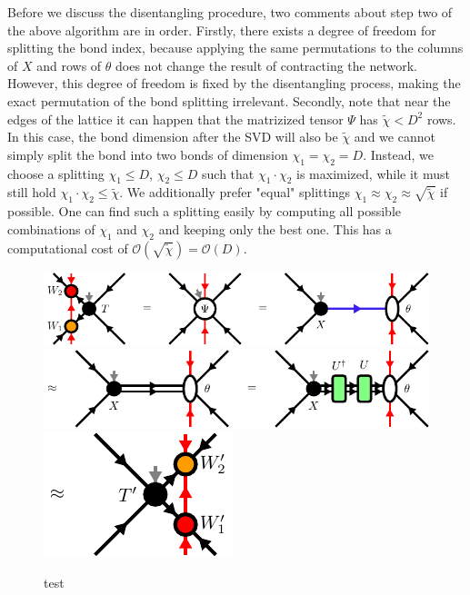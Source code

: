 Before we discuss the disentangling procedure, two comments about step two of the above algorithm are in order. Firstly, there exists a degree of freedom for splitting the bond index, because applying the same permutations to the columns of $X$ and rows of $\theta$ does not change the result of contracting the network. However, this degree of freedom is fixed by the disentangling process, making the exact permutation of the bond splitting irrelevant. Secondly, note that near the edges of the lattice it can happen that the matrizized tensor $\Psi$ has $\tilde{\chi} < D^2$ rows. In this case, the bond dimension after the SVD will also be $\tilde{\chi}$ and we cannot simply split the bond into two bonds of dimension $\chi_1=\chi_2=D$. Instead, we choose a splitting $\chi_1 \le D$, $\chi_2 \le D$ such that $\chi_1\cdot\chi_2$ is maximized, while it must still hold $\chi_1\cdot\chi_2\le\tilde{\chi}$. We additionally prefer "equal" splittings $\chi_1\approx\chi_2\approx\sqrt{\tilde{\chi}}$ if possible. One can find such a splitting easily by computing all possible combinations of $\chi_1$ and $\chi_2$ and keeping only the best one. This has a computational cost of $\mathcal{O}\left(\sqrt{\tilde{\chi}}\right) = \mathcal{O}\left(D\right)$. \par
\begin{figure}
	\centering
	\subcaptionbox{\label{fig:yb_move_svd_disent_a}}
	{%
		\includegraphics[scale=1.0]{figures/tikz/disoTPS/yang_baxter_move_svd/yang_baxter_move_svd_a.pdf}
	}
	\subcaptionbox{\label{fig:yb_move_svd_disent_b}}
	{%
		\includegraphics[scale=1.0]{figures/tikz/disoTPS/yang_baxter_move_svd/yang_baxter_move_svd_b.pdf}
	}
	\subcaptionbox{\label{fig:yb_move_svd_disent_c}}
	{%
		\includegraphics[scale=1.0]{figures/tikz/disoTPS/yang_baxter_move_svd/yang_baxter_move_svd_c.pdf}
	}
	\caption{test}
	\label{fig:yb_move_svd_disent}
\end{figure}
